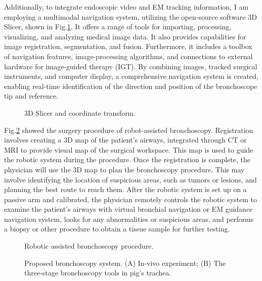 \documentclass[
    ngerman,american
    ]{scrartcl}
\begin{document}
Additionally, to integrate endoscopic video and EM tracking information, I am employing a multimodal navigation system, utilizing the open-source software 3D Slicer, shown in Fig.\ref{3dsclicer}. It offers a range of tools for importing, processing, visualizing, and analyzing medical image data. It also provides capabilities for image registration, segmentation, and fusion. Furthermore, it includes a toolbox of navigation features, image-processing algorithms, and connections to external hardware for image-guided therapy (IGT). By combining images, tracked surgical instruments, and computer display, a comprehensive navigation system is created, enabling real-time identification of the direction and position of the bronchoscope tip and reference.


\begin{figure}[H]
	\caption{3D Slicer and coordinate transform.}
	\label{3dsclicer}
\end{figure}

Fig.\ref{Procedure} showed the surgery procedure of robot-assisted bronchoscopy. Registration involves creating a 3D map of the patient's airways, integrated through CT or MRI to provide visual map of the surgical workspace. This map is used to guide the robotic system during the procedure. Once the registration is complete, the physician will use the 3D map to plan the bronchoscopy procedure. This may involve identifying the location of suspicious areas, such as tumors or lesions, and planning the best route to reach them. After the robotic system is set up on a passive arm and calibrated, the physician remotely controls the robotic system to examine the patient's airways with virtual bronchial navigation or EM guidance  navigation system, looks for any abnormalities or suspicious areas, and performs a biopsy or other procedure to obtain a tissue sample for further testing.	




\begin{figure}[H]
	\caption{Robotic assisted bronchoscopy procedure.}
	\label{Procedure}
\end{figure}      

\begin{figure}[H]
	\caption{Proposed bronchoscopy system. (A) In-vivo experiment; (B) The	three-stage bronchoscopy tools in pig’s trachea.}
	\label{animal}
\end{figure}
\end{document}
